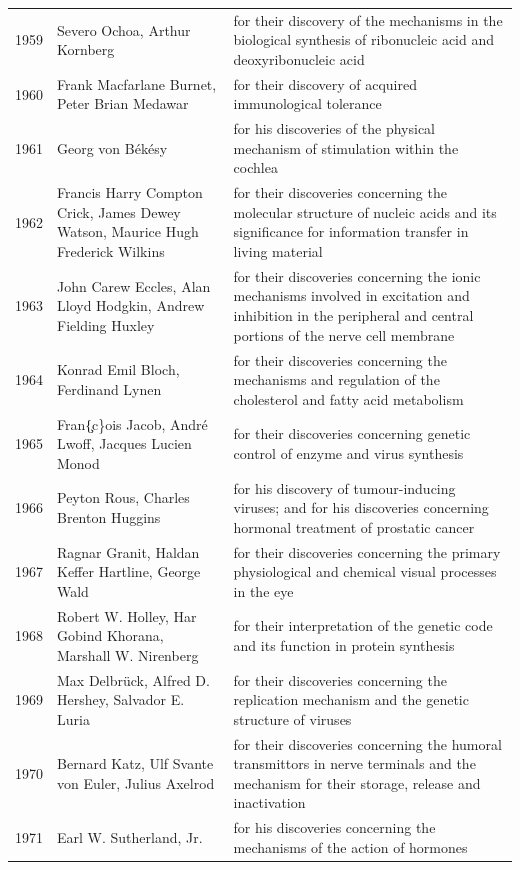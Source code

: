 \documentclass[12pt,a4paper]{book}
\begin{document}
{\begin{longtable}{cp{3.2cm}p{5.5cm}}
1959 & Severo Ochoa, Arthur Kornberg & for their discovery of the mechanisms in the biological synthesis of ribonucleic acid and deoxyribonucleic acid \\
1960 & Frank Macfarlane Burnet, Peter Brian Medawar & for their discovery of acquired immunological tolerance \\
1961 & Georg von B\'ek\'esy & for his discoveries of the physical mechanism of stimulation within the cochlea \\
1962 & Francis Harry Compton Crick, James Dewey Watson, Maurice Hugh Frederick Wilkins & for their discoveries concerning the molecular structure of nucleic acids and its significance for information transfer in living material \\
1963 & John Carew Eccles, Alan Lloyd Hodgkin, Andrew Fielding Huxley & for their discoveries concerning the ionic mechanisms involved in excitation and inhibition in the peripheral and central portions of the nerve cell membrane \\
1964 & Konrad Emil Bloch, Ferdinand Lynen & for their discoveries concerning the mechanisms and regulation of the cholesterol and fatty acid metabolism \\
1965 & Fran\c\{c\}ois Jacob, Andr\'e Lwoff, Jacques Lucien Monod & for their discoveries concerning genetic control of enzyme and virus synthesis \\
1966 & Peyton Rous, Charles Brenton Huggins & for his discovery of tumour-inducing viruses; and for his discoveries concerning hormonal treatment of prostatic cancer \\
1967 & Ragnar Granit, Haldan Keffer Hartline, George Wald & for their discoveries concerning the primary physiological and chemical visual processes in the eye \\
1968 & Robert W. Holley, Har Gobind Khorana, Marshall W. Nirenberg & for their interpretation of the genetic code and its function in protein synthesis \\
1969 & Max Delbr\"uck, Alfred D. Hershey, Salvador E. Luria & for their discoveries concerning the replication mechanism and the genetic structure of viruses \\
1970 & Bernard Katz, Ulf Svante von Euler, Julius Axelrod & for their discoveries concerning the humoral transmittors in nerve terminals and the mechanism for their storage, release and inactivation \\
1971 & Earl W. Sutherland, Jr. & for his discoveries concerning the mechanisms of the action of hormones \\

\end{longtable}}
\end{document}
